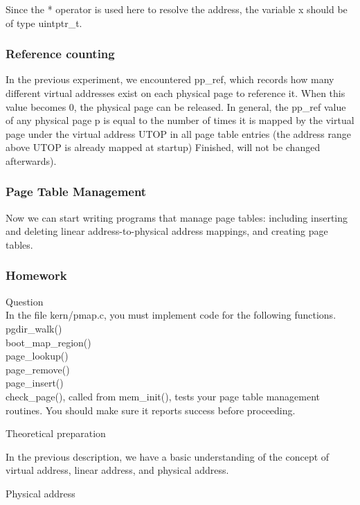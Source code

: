 Since the * operator is used here to resolve the address, the variable x should be of type uintptr\_t.

\subsubsection{Reference counting}
In the previous experiment, we encountered pp\_ref, which records how many different virtual addresses exist on each physical page to reference it. When this value becomes 0, the physical page can be released. In general, the pp\_ref value of any physical page p is equal to the number of times it is mapped by the virtual page under the virtual address UTOP in all page table entries (the address range above UTOP is already mapped at startup) Finished, will not be changed afterwards).

\subsubsection{Page Table Management}
Now we can start writing programs that manage page tables: including inserting and deleting linear address-to-physical address mappings, and creating page tables.

\subsubsection{Homework }
\begin{flushleft}
{\Large Question}\\
In the file kern/pmap.c, you must implement code for the following functions.\\
pgdir\_walk()\\
boot\_map\_region()\\
page\_lookup()\\
page\_remove()\\
page\_insert()\\	
check\_page(), called from mem\_init(), tests your page table management routines. You should make sure it reports success before proceeding.\\
\end{flushleft}
\begin{flushleft}
{\Large Theoretical preparation}
\end{flushleft}

In the previous description, we have a basic understanding of the concept of virtual address, linear address, and physical address.

{\large Physical address}

